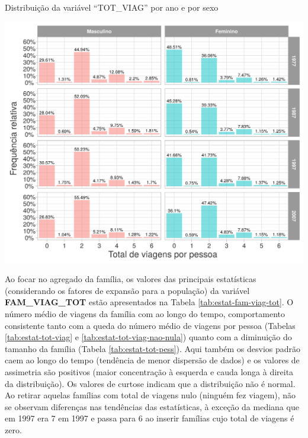 \begin{grafico}[htb]%
    \caption{\label{graf:distr-num-viag}Distribuição da variável ``TOT_VIAG'' por ano e por sexo}%
    \begin{center}%
        \includegraphics[width=1\textwidth]{./imagens/tot-viag-pess.png}%
    \end{center}%
\end{grafico}%

\newpage
Ao focar no agregado da família, os valores das principais estatísticas (considerando os fatores de expansão para a população) da variável \textbf{FAM_VIAG_TOT} estão apresentados na Tabela \ref{tab:estat-fam-viag-tot}.
O número médio de viagens da família com ao longo do tempo, comportamento consistente tanto com a queda do número médio de viagens por pessoa (Tabelas \ref{tab:estat-tot-viag} e \ref{tab:estat-tot-viag-nao-nula}) quanto com a diminuição do tamanho da família (Tabela \ref{tab:estat-tot-pess}).
Aqui também os desvios padrão caem ao longo do tempo (tendência de menor dispersão de dados) e os valores de assimetria são positivos (maior concentração à esquerda e cauda longa à direita da distribuição). Os valores de curtose indicam que a distribuição não é normal.
Ao retirar aquelas famílias com total de viagens nulo (ninguém fez viagem), não se observam diferenças nas tendências das estatísticas, à exceção da mediana que em 1997 era 7 em 1997 e passa para 6 ao inserir famílias cujo total de viagens é zero.

